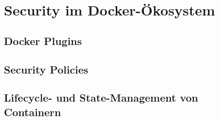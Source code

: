 \documentclass[../main.tex]{subfiles}
\begin{document}



\chapter{Security im Docker-Ökosystem}
\label{secEcosystem}



  \section{Docker Plugins}

  \section{Security Policies}

  \section{Lifecycle- und State-Management von Containern}
\end{document}
